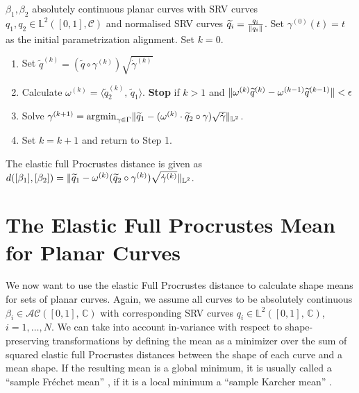 \begin{algorithm}
  \label{alg:2-dist}
  $\beta_1, \beta_2$ absolutely continuous planar curves with SRV curves $q_1, q_2 \in \mathbb{L}^2([0,1], \mathcal{C})$ and normalised SRV curves $\widetilde q_i = \frac{q_i}{\lVert q_i\rVert}$.
  Set $\gamma^{(0)}(t) = t$  as the initial parametrization alignment.
  Set $k = 0$. 
  \begin{enumerate}
    \item Set $\widetilde q^{(k)} = (\widetilde q \circ \gamma^{(k)}) \sqrt{\dot\gamma^{(k)}}$
    \item Calculate $\omega^{(k)} = \langle \widetilde q_2^{(k)},\, \widetilde q_1 \rangle$. \textbf{Stop} if $k > 1$ and $\lVert\omega^{(k)} \widetilde q^{(k)} - \omega^{(k-1)} \widetilde q^{(k-1)}\rVert < \epsilon$
    \item Solve $\gamma^{(k+1)} = \operatorname*{argmin}_{\gamma \in \Gamma} \lVert\widetilde q_1 - (\omega^{(k)} \cdot \widetilde q_2 \circ \gamma ) \sqrt{\dot\gamma}\rVert_{\mathbb{L}^2}$.
    \item Set $k = k+1$ and return to Step 1.
  \end{enumerate}
  The elastic full Procrustes distance is given as $d([\beta_1],[\beta_2]) = \lVert\widetilde q_1 - \omega^{(k)} ( \widetilde q_2 \circ \gamma^{(k)} ) \sqrt{\dot{\gamma}^{(k)}}\rVert_{\mathbb{L}^2}$.
\end{algorithm}

%



\section{The Elastic Full Procrustes Mean for Planar Curves}
\label{sec:2-mean}
We now want to use the elastic Full Procrustes distance to calculate shape means for sets of planar curves.
Again, we assume all curves to be absolutely continuous $\beta_i \in \mathcal{AC}([0,1],\, \mathbb{C})$ with corresponding SRV curves $q_i \in \mathbb{L}^2([0,1],\, \mathbb{C})$, $i=1,\dots,N$.
We can take into account in-variance with respect to shape-preserving transformations by defining the mean as a minimizer over the sum of squared elastic full Procrustes distances between the shape of each curve and a mean shape.
If the resulting mean is a global minimum, it is usually called a \enquote{sample Fr\'echet mean} \parencite{Frechet1948}, if it is a local minimum a \enquote{sample Karcher mean} \parencite{Karcher1977} \parencite[see][111]{DrydenMardia2016}.

